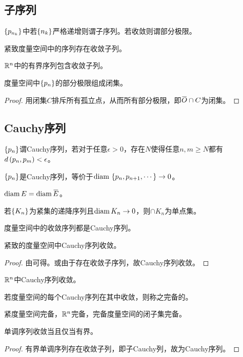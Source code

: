 \documentclass{ctexrep}
\begin{document}
  \subsection{子序列}
  \begin{definition}
    $\left\{p_{n_k}\right\}$中若$\left\{n_k\right\}$严格递增则谓子序列。若收敛则谓部分极限。
  \end{definition}
  \begin{theorem}
    紧致度量空间中的序列存在收敛子列。
  \end{theorem}
  \begin{corollary}
    $\mathbb{R}^n$中的有界序列包含收敛子列。
  \end{corollary}
  \begin{theorem}
    度量空间中$\left\{p_n\right\}$的部分极限组成闭集。
  \end{theorem}
  \begin{proof}
    用闭集$C$排斥所有孤立点，从而所有部分极限，即$\clo{O}\cap C$为闭集。
  \end{proof}
  \subsection{Cauchy序列}
  \begin{definition}
    $\left\{p_n\right\}$谓Cauchy序列，若对于任意$\epsilon>0$，存在$N$使得任意$n,m\ge N$都有$d\left(p_n,p_m\right)<\epsilon$。
  \end{definition}
  $\left\{p_n\right\}$是Cauchy序列，等价于$\mathrm{diam}\, \left\{p_n,p_{n+1},\cdots\right\} \rightarrow 0$。
  \begin{theorem}
    $\diam E = \diam \clo{E}$。
  \end{theorem}
  \begin{theorem}
    \label{thm:kncap}
    若$\left\{K_n\right\}$为紧集的递降序列且$\mathrm{diam}\, K_n \rightarrow 0$，则$\cap K_n$为单点集。
  \end{theorem}
  \begin{theorem}
    度量空间中的收敛序列都是Cauchy序列。
  \end{theorem}
  \begin{theorem}
    紧致的度量空间中Cauchy序列收敛。
  \end{theorem}
  \begin{proof}
    由可得。或由于存在收敛子序列，故Cauchy序列收敛。
  \end{proof}
  \begin{theorem}
    $\mathbb{R}^n$中Cauchy序列收敛。
  \end{theorem}
  \begin{definition}
    若度量空间的每个Cauchy序列在其中收敛，则称之完备的。
  \end{definition}
  \begin{corollary}
    紧度量空间完备，$\mathbb{R}^n$完备，完备度量空间的闭子集完备。
  \end{corollary}
  \begin{theorem}
    单调序列收敛当且仅当有界。
  \end{theorem}
  \begin{proof}
    有界单调序列存在收敛子列，即子Cauchy列，故为Cauchy序列。
  \end{proof}
\end{document}

